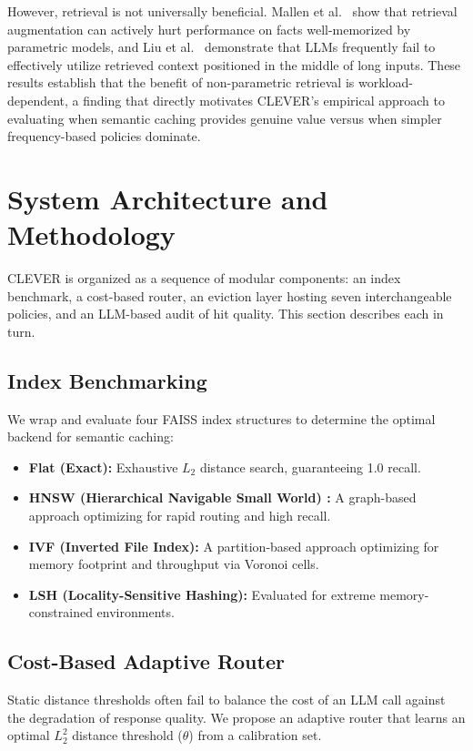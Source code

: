 \documentclass[sigconf,nonacm]{acmart}
\begin{document}
However, retrieval is not universally beneficial. Mallen et al.\ \cite{mallen2023trust} show that retrieval augmentation can actively hurt performance on facts well-memorized by parametric models, and Liu et al.\ \cite{liu2024lost} demonstrate that LLMs frequently fail to effectively utilize retrieved context positioned in the middle of long inputs. These results establish that the benefit of non-parametric retrieval is workload-dependent, a finding that directly motivates CLEVER's empirical approach to evaluating when semantic caching provides genuine value versus when simpler frequency-based policies dominate.

\section{System Architecture and Methodology}
CLEVER is organized as a sequence of modular components: an index benchmark, a cost-based router, an eviction layer hosting seven interchangeable policies, and an LLM-based audit of hit quality. This section describes each in turn.

\subsection{Index Benchmarking}
We wrap and evaluate four FAISS \cite{johnson2019faiss} index structures to determine the optimal backend for semantic caching:
\begin{itemize}
\item \textbf{Flat (Exact):} Exhaustive $L_2$ distance search, guaranteeing 1.0 recall.
\item \textbf{HNSW (Hierarchical Navigable Small World) \cite{malkov2018hnsw}:} A graph-based approach optimizing for rapid routing and high recall.
\item \textbf{IVF (Inverted File Index):} A partition-based approach optimizing for memory footprint and throughput via Voronoi cells.
\item \textbf{LSH (Locality-Sensitive Hashing):} Evaluated for extreme memory-constrained environments.
\end{itemize}

\subsection{Cost-Based Adaptive Router}
Static distance thresholds often fail to balance the cost of an LLM call against the degradation of response quality. We propose an adaptive router that learns an optimal $L_2^2$ distance threshold ($\theta$) from a calibration set. 
\end{document}
